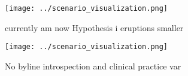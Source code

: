 \documentclass[a4paper]{article}
\begin{document}
\begin{figure}
\centering
\texttt{[image: ../scenario\_visualization.png]}
\caption{ currently am now Hypothesis i eruptions smaller 
}
\end{figure}
 
\begin{figure}
\centering
\texttt{[image: ../scenario\_visualization.png]}
\caption{No byline introspection and clinical practice var
}
\end{figure}
 
\end{document}
